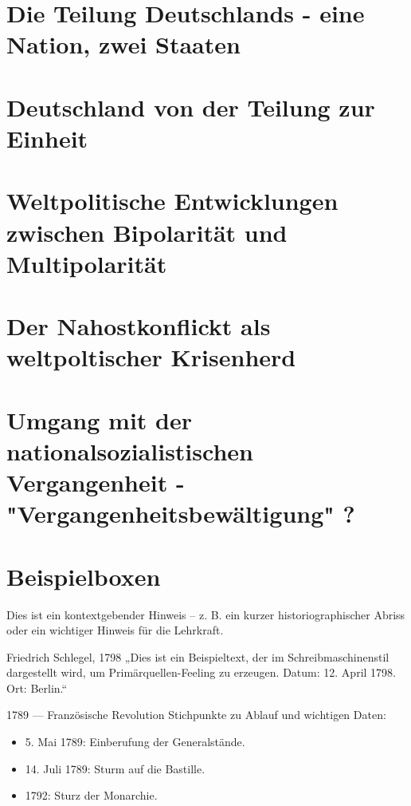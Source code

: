 \documentclass[11pt,a4paper,oneside]{article}
\begin{document}
	\section{Die Teilung Deutschlands - eine Nation, zwei Staaten}
	\section{Deutschland von der Teilung zur Einheit}
	\section{Weltpolitische Entwicklungen zwischen Bipolarität und Multipolarität}
	\section{Der Nahostkonflickt als weltpoltischer Krisenherd}
	\section{Umgang mit der nationalsozialistischen Vergangenheit - "Vergangenheitsbewältigung" ?}
	
	\newpage
	
	\section{Beispielboxen}
	
	\begin{histnote}
		Dies ist ein kontextgebender Hinweis – z. B. ein kurzer historiographischer Abriss oder ein wichtiger Hinweis für die Lehrkraft.
	\end{histnote}

	
	\begin{primarysource}{Friedrich Schlegel, 1798}
		„Dies ist ein Beispieltext, der im Schreibmaschinenstil dargestellt wird, um Primärquellen-Feeling zu erzeugen.
		Datum: 12. April 1798. Ort: Berlin.“
	\end{primarysource}
	
	\begin{timeline}{1789 — Französische Revolution}
		Stichpunkte zu Ablauf und wichtigen Daten:
		\begin{itemize}
			\item 5. Mai 1789: Einberufung der Generalstände.
			\item 14. Juli 1789: Sturm auf die Bastille.
			\item 1792: Sturz der Monarchie.
		\end{itemize}
	\end{timeline}
	
\end{document}

